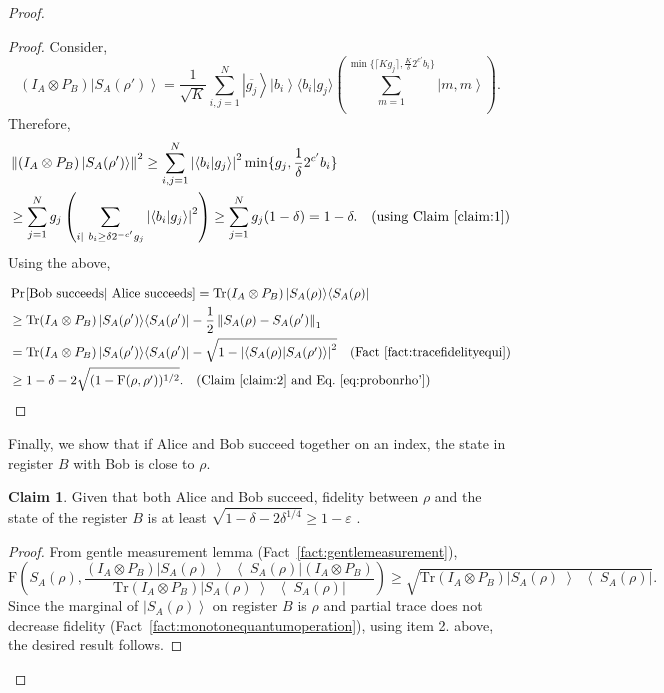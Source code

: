 \documentclass[11pt,a4paper]{article}
\def\F{\mathrn{F}}
\theoremstyle{plain}
\theoremstyle{definition}
\newtheorem{claim}[theorem]{Claim}
\newcommand {\Br} [1] {\ensuremath{ \left[ #1 \right] }}
\newcommand {\minusspace} {\: \! \!}
\newcommand {\Fn} [2] {\ensuremath{ #1 \minusspace \Br{ #2 } }}
\newcommand {\prob} [1] {\Fn{\Pr}{#1}}
\newcommand {\abs} [1] {\ensuremath{ \left| #1 \right| }}
\newcommand {\norm} [1] {\ensuremath{ \left\| #1 \right\| }}
\newcommand {\normsub} [2] {\ensuremath{ \norm{#1}_{#2} }}
\newcommand {\onenorm} [1] {\normsub{#1}{1}}
\newcommand {\ket} [1] {\ensuremath{ \left| #1 \right\rangle }}
\newcommand {\ketbratwo} [2] {\ensuremath{ \left| #1 \middle\rangle \middle\langle #2 \right| }}
\newcommand {\ketbra} [1] {\ketbratwo{#1}{#1}}
\newcommand {\Tr} {\ensuremath{ \mathrm{Tr} }}
\def\ve{{\varepsilon}}
\def\F{\mathrm{F}}
\newcommand{\conjugate}[1]{\overline{#1}}
\newcommand{\braket}[2]{\langle#1|#2\rangle}
\begin{document}
\begin{proof}
\begin{proof}
Consider,
\begin{equation*}
(I_A\otimes P_B)\ket{S_A(\rho')} = \frac{1}{\sqrt{K}}\sum_{i,j=1}^N\ket{\conjugate{g_j}} \ket{b_i}\braket{b_i}{g_j} \left(\sum_{m=1}^{\min\{\lceil Kg_j\rceil, \frac{K}{\delta} 2^{c'}b_i\}}\ket{m, m} \right).
\end{equation*}
Therefore,
\begin{align}
& \norm{(I_A\otimes P_B)\ket{S_A(\rho')} }^2 \geq \sum_{i,j=1}^N \abs{\braket{b_i}{g_j}}^2 \min\{g_j, \frac{1}{\delta}2^{c'}b_i \} \nonumber \\
& \geq \sum_{j=1}^N g_j \left(\sum_{i|~b_i\geq \delta 2^{-c'}g_j} \abs{\braket{b_i}{g_j}}^2 \right) \geq \sum_{j=1}^N g_j(1- \delta) = 1- \delta  . \quad \mbox{(using Claim~\ref{claim:1})} \label{eq:probonrho'}
\end{align}
Using the above,

\begin{align*}
& \prob{\text{Bob succeeds}|~\text{Alice succeeds}}  =  \Tr (I_A\otimes P_B)\ketbra{S_A(\rho)} \\
& \geq  \Tr (I_A\otimes P_B)\ketbra{S_A(\rho')}  - \frac{1}{2} \onenorm{S_A(\rho) - S_A(\rho')} \\
& = \Tr (I_A\otimes P_B)\ketbra{S_A(\rho')}  -  \sqrt{1- \abs{\braket{S_A(\rho)}{S_A(\rho')}}^2} \quad \mbox{(Fact~\ref{fact:tracefidelityequi})} \\
& \geq  1 -  \delta  - 2  \sqrt{ (1-\F(\rho,\rho'))^{1/2}}  . \quad \mbox{(Claim~\ref{claim:2} and Eq.~\eqref{eq:probonrho'})}
\end{align*}
\end{proof}

Finally, we show that if Alice and Bob succeed together on an index, the state in register $B$ with Bob is close to $\rho$.
\begin{claim}
\label{claim:boboutput}
Given that both Alice and Bob succeed, fidelity between $\rho$ and the state of the register $B$ is at least $\sqrt{1 - \delta -  2 \delta^{1/4}} \geq 1 - \ve $ .
\end{claim}

\begin{proof}
From gentle measurement lemma (Fact~\ref{fact:gentlemeasurement}), 
$$\F(S_A(\rho), \frac{(I_A\otimes P_B)\ketbra{S_A(\rho)} (I_A\otimes P_B) }{\Tr (I_A\otimes P_B)\ketbra{S_A(\rho)}}) \geq \sqrt{\Tr (I_A\otimes P_B)\ketbra{S_A(\rho)}}. $$ 
Since the marginal of $\ket{S_A(\rho)}$ on  register $B$ is $\rho$ and partial trace does not decrease fidelity (Fact~\ref{fact:monotonequantumoperation}), using item 2. above, the desired result follows. 


\end{proof}
\end{proof}
\end{document}
